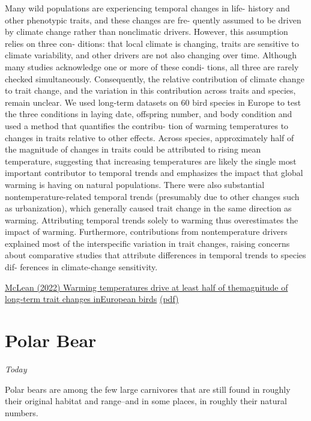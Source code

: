 \documentclass[
]{book}
\begin{document}
Many wild populations are experiencing temporal changes in life-
history and other phenotypic traits, and these changes are fre-
quently assumed to be driven by climate change rather than
nonclimatic drivers. However, this assumption relies on three con-
ditions: that local climate is changing, traits are sensitive to climate
variability, and other drivers are not also changing over time.
Although many studies acknowledge one or more of these condi-
tions, all three are rarely checked simultaneously. Consequently,
the relative contribution of climate change to trait change, and the
variation in this contribution across traits and species, remain
unclear. We used long-term datasets on 60 bird species in Europe
to test the three conditions in laying date, offspring number, and
body condition and used a method that quantiﬁes the contribu-
tion of warming temperatures to changes in traits relative to other
effects. Across species, approximately half of the magnitude of
changes in traits could be attributed to rising mean temperature,
suggesting that increasing temperatures are likely the single most
important contributor to temporal trends and emphasizes the
impact that global warming is having on natural populations.
There were also substantial nontemperature-related temporal
trends (presumably due to other changes such as urbanization),
which generally caused trait change in the same direction as
warming. Attributing temporal trends solely to warming thus
overestimates the impact of warming. Furthermore, contributions
from nontemperature drivers explained most of the interspeciﬁc
variation in trait changes, raising concerns about comparative
studies that attribute differences in temporal trends to species dif-
ferences in climate-change sensitivity.

\href{https://www.pnas.org/doi/epdf/10.1073/pnas.2105416119}{McLean (2022) Warming temperatures drive at least half of themagnitude of long-term trait changes inEuropean birds}
\href{pdf/McLean_2022_Warming_Bird_Traits.pdf}{(pdf)}

\hypertarget{polar-bear}{%
\section{Polar Bear}\label{polar-bear}}

\emph{Today}

Polar bears are among the few large carnivores that are still found in roughly their original habitat and range--and in some places, in roughly their natural numbers.
\end{document}
